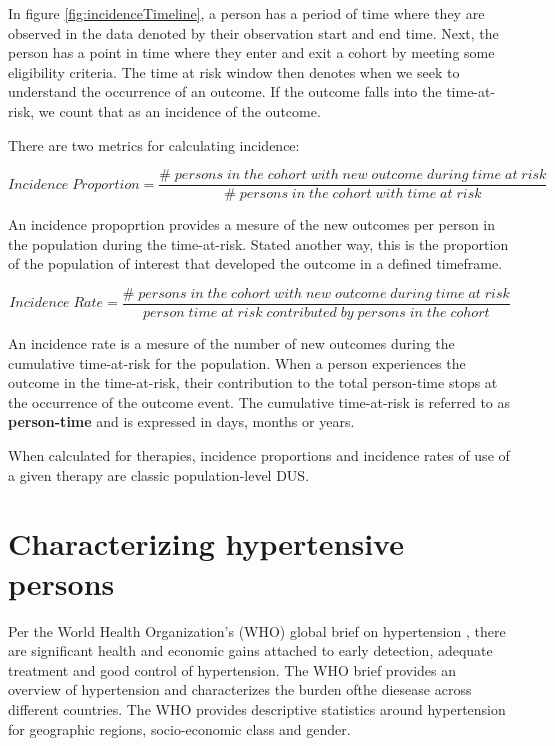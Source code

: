 \documentclass[11pt]{book}
\theoremstyle{definition}
\theoremstyle{definition}
\theoremstyle{definition}
\theoremstyle{remark}
\begin{document}
In figure \ref{fig:incidenceTimeline}, a person has a period of time where they are observed in the data denoted by their observation start and end time. Next, the person has a point in time where they enter and exit a cohort by meeting some eligibility criteria. The time at risk window then denotes when we seek to understand the occurrence of an outcome. If the outcome falls into the time-at-risk, we count that as an incidence of the outcome.

There are two metrics for calculating incidence:

\begin{equation} 
Incidence\;Proportion = \frac{\#\;persons\;in\;the\;cohort\;with\;new\;outcome\;during\;time\;at\;risk}{\#\;persons\;in\;the\;cohort\;with\;time\;at\;risk}
\end{equation}

An incidence propoprtion provides a mesure of the new outcomes per person in the population during the time-at-risk. Stated another way, this is the proportion of the population of interest that developed the outcome in a defined timeframe.

\begin{equation} 
Incidence\;Rate = \frac{\#\;persons\;in\;the\;cohort\;with\;new\;outcome\;during\;time\;at\;risk}{person\;time\;at\;risk\;contributed\;by\;persons\;in\;the\;cohort}
\end{equation}

An incidence rate is a mesure of the number of new outcomes during the cumulative time-at-risk for the population. When a person experiences the outcome in the time-at-risk, their contribution to the total person-time stops at the occurrence of the outcome event. The cumulative time-at-risk is referred to as \textbf{person-time} and is expressed in days, months or years. 

When calculated for therapies, incidence proportions and incidence rates of use of a given therapy are classic population-level DUS.

\hypertarget{characterizing-hypertensive-persons}{%
\section{Characterizing hypertensive persons}\label{characterizing-hypertensive-persons}}

Per the World Health Organization's (WHO) global brief on hypertension \citep{WHOHypertension}, there are significant health and economic gains attached to early detection, adequate treatment and good control of hypertension. The WHO brief provides an overview of hypertension and characterizes the burden ofthe diesease across different countries. The WHO provides descriptive statistics around hypertension for geographic regions, socio-economic class and gender.
\end{document}
